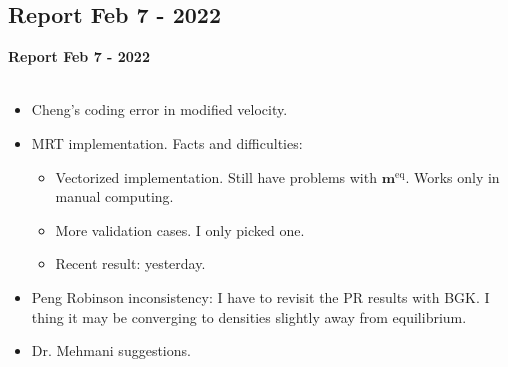\documentclass[8pt]{beamer}
\begin{document}
	\subsection{Report Feb 7 - 2022}
	\label{}
	\justifying
	\begin{frame}
		\textbf{Report Feb 7 - 2022}\\~\\
		\begin{itemize}
			\item Cheng's coding error in modified velocity.
			\item MRT implementation. Facts and difficulties:
			\begin{itemize}
				\item Vectorized implementation. Still have problems with $\mathbf{m}^{\text{eq}}$. Works only in manual computing.
				\item More validation cases. I only picked one.
				\item Recent result: yesterday.
			\end{itemize}
			\item Peng Robinson inconsistency: I have to revisit the PR results with BGK. I thing it may be converging to densities slightly away from equilibrium.
			\item Dr. Mehmani suggestions.
			
		\end{itemize}
	\end{frame}
	
\end{document}
